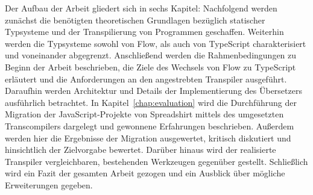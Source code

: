 Der Aufbau der Arbeit gliedert sich in sechs Kapitel: Nachfolgend werden zunächst die benötigten theoretischen Grundlagen bezüglich statischer Typsysteme und der Transpilierung von Programmen geschaffen. Weiterhin werden die Typsysteme sowohl von Flow, als auch von TypeScript charakterisiert und voneinander abgegrenzt. Anschließend werden die Rahmenbedingungen zu Beginn der Arbeit beschrieben, die Ziele des Wechsels von Flow zu TypeScript erläutert und die Anforderungen an den angestrebten Transpiler ausgeführt. Daraufhin werden Architektur und Details der Implementierung des Übersetzers ausführlich betrachtet. In Kapitel~\ref{chap:evaluation} wird die Durchführung der Migration der JavaScript-Projekte von Spreadshirt mittels des umgesetzten Transcompilers dargelegt und gewonnene Erfahrungen beschrieben. Außerdem werden hier die Ergebnisse der Migration ausgewertet, kritisch diskutiert und hinsichtlich der Zielvorgabe bewertet. Darüber hinaus wird der realisierte Transpiler vergleichbaren, bestehenden Werkzeugen gegenüber gestellt. Schließlich wird ein Fazit der gesamten Arbeit gezogen und ein Ausblick über mögliche Erweiterungen gegeben.

